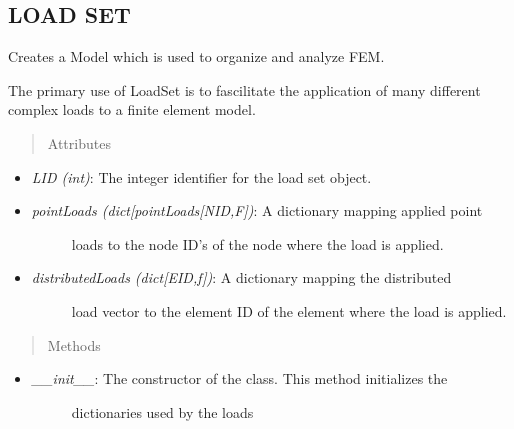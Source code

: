 \documentclass[letterpaper,10pt,english]{sphinxmanual}
\begin{document}
\subsection{LOAD SET}
\label{FEM:load-set}

\begin{fulllineitems}
\label{FEM:AeroComBAT.FEM.LoadSet}
Creates a Model which is used to organize and analyze FEM.

The primary use of LoadSet is to fascilitate the application of many
different complex loads to a finite element model.
\begin{quote}\begin{description}
\item[{Attributes}] \leavevmode
\end{description}\end{quote}
\begin{itemize}
\item {} 
\emph{LID (int)}: The integer identifier for the load set object.

\item {} \begin{description}
\item[{\emph{pointLoads (dict{[}pointLoads{[}NID,F{]})}: A dictionary mapping applied point}] \leavevmode
loads to the node ID's of the node where the load is applied.

\end{description}

\item {} \begin{description}
\item[{\emph{distributedLoads (dict{[}EID,f{]})}: A dictionary mapping the distributed}] \leavevmode
load vector to the element ID of the element where the load is applied.

\end{description}

\end{itemize}
\begin{quote}\begin{description}
\item[{Methods}] \leavevmode
\end{description}\end{quote}
\begin{itemize}
\item {} \begin{description}
\item[{\emph{\_\_init\_\_}: The constructor of the class. This method initializes the}] \leavevmode
dictionaries used by the loads


\end{description}
\end{itemize}
\end{fulllineitems}
\end{document}
